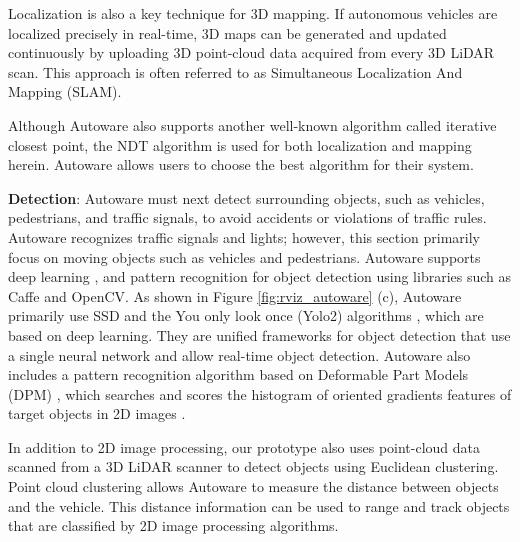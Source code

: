 Localization is also a key technique for 3D mapping.
If autonomous vehicles are localized precisely in real-time, 3D maps can
be generated and updated continuously by uploading 3D point-cloud
data acquired from every 3D LiDAR scan.
This approach is often referred to as Simultaneous Localization And
Mapping (SLAM).

Although Autoware also supports another well-known algorithm called iterative closest point,
the NDT algorithm is used for both localization and mapping herein.
Autoware allows users to choose the best algorithm
for their system.

  
\textbf{Detection}:
Autoware must next detect surrounding objects, such as
vehicles, pedestrians, and traffic signals, to avoid accidents or
violations of traffic rules.
Autoware recognizes traffic signals and lights; however, this section primarily focus on moving objects such as vehicles and pedestrians.
Autoware supports deep learning \cite{liu2016ssd},
\cite{DBLP:journals/corr/RedmonF16} and pattern recognition
\cite{felzenszwalb2010object} for object detection
using libraries such as Caffe and OpenCV.
As shown in Figure \ref{fig:rviz_autoware} (c), Autoware primarily use SSD \cite{liu2016ssd} and the You only look once (Yolo2) algorithms
\cite{DBLP:journals/corr/RedmonF16}, which are based on deep learning.
They are unified frameworks for object detection that use a single neural
network and allow real-time object detection.
Autoware also includes a pattern recognition algorithm based on Deformable
Part Models (DPM) \cite{felzenszwalb2010object}, which searches and scores the
histogram of oriented gradients features of target objects in 2D images \cite{dalal2005histograms}.

In addition to 2D image processing, our prototype also uses point-cloud data scanned from a
3D LiDAR scanner to detect objects using Euclidean clustering.
Point cloud clustering allows Autoware to measure the distance between objects and the vehicle.
This distance information can be used to range and track objects that are
classified by 2D image processing algorithms.

